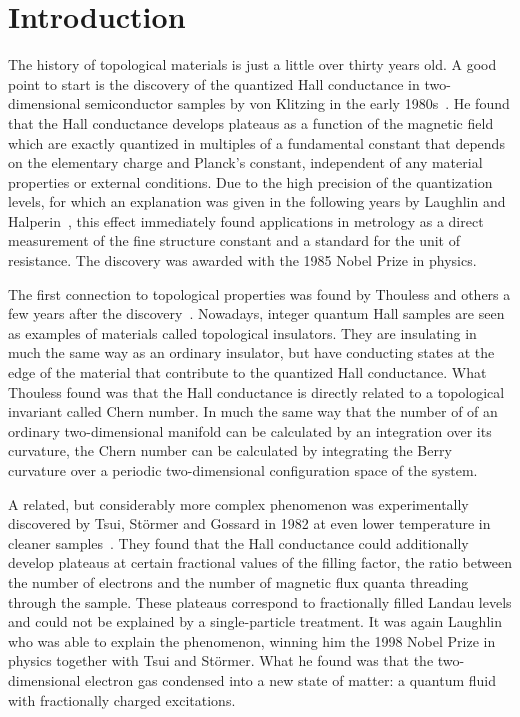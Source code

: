 \chapter*{Introduction}


The history of topological materials is just a little over thirty years old.
A good point to start is the discovery of the quantized Hall conductance in two-dimensional semiconductor samples by von Klitzing in the early 1980s~\cite{Klitzing1980,Klitzing1992}.
He found that the Hall conductance develops plateaus as a function of the magnetic field which are exactly quantized in multiples of a fundamental constant that depends on the elementary charge and Planck's constant, independent of any material properties or external conditions.
Due to the high precision of the quantization levels, for which an explanation was given in the following years by Laughlin and Halperin~\cite{Laughlin1981,Halperin1982}, this effect immediately found applications in metrology as a direct measurement of the fine structure constant and a standard for the unit of resistance.
The discovery was awarded with the 1985 Nobel Prize in physics.

The first connection to topological properties was found by Thouless and others a few years after the discovery~\cite{Thouless1982,Niu1985,Kohmoto1985,Avron1985,Kohmoto1989,Bellissard1994,Avron2003}.
Nowadays, integer quantum Hall samples are seen as examples of materials called topological insulators. They are insulating in much the same way as an ordinary insulator, but have conducting states at the edge of the material that contribute to the quantized Hall conductance.
What Thouless found was that the Hall conductance is directly related to a topological invariant called Chern number.
In much the same way that the number of  of an ordinary two-dimensional manifold can be calculated by an integration over its curvature, the Chern number can be calculated by integrating the Berry curvature over a periodic two-dimensional configuration space of the system. 

A related, but considerably more complex phenomenon was experimentally discovered by Tsui, Störmer and Gossard in 1982 at even lower temperature in cleaner samples~\cite{Tsui1982}.
They found that the Hall conductance could additionally develop plateaus at certain fractional values of the filling factor, the ratio between the number of electrons and the number of magnetic flux quanta threading through the sample.
These plateaus correspond to fractionally filled Landau levels and could not be explained by a single-particle treatment.
It was again Laughlin who was able to explain the phenomenon, winning him the 1998 Nobel Prize in physics together with Tsui and Störmer.
What he found was that the two-dimensional electron gas condensed into a new state of matter: a quantum fluid with fractionally charged excitations.

